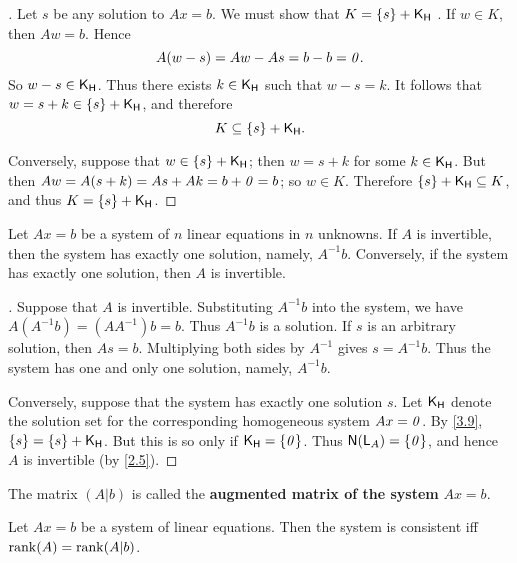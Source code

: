 \begin{proof}[]
	Let \(s\) be any solution to \(Ax = b\).
	We must show that \(K = \left\lbrace s\right\rbrace + \mathsf{K}_{\mathsf{H}}\) .
	If \(w \in K\), then \(Aw = b\).
	Hence
	\[
		A(w - s) = Aw - As = b - b = \mathit{0}.
	\]
	So \(w - s \in \mathsf{K}_{\mathsf{H}}\).
	Thus there exists \(k \in \mathsf{K}_{\mathsf{H}}\) such that \(w - s = k\).
	It follows that \(w = s + k \in \left\lbrace s\right\rbrace + \mathsf{K}_{\mathsf{H}}\), and therefore
	\[
		K \subseteq \left\lbrace s\right\rbrace + \mathsf{K}_{\mathsf{H}}.
	\]

	Conversely, suppose that \(w \in \left\lbrace s\right\rbrace + \mathsf{K}_{\mathsf{H}}\);
	then \(w = s + k\) for some \(k \in \mathsf{K}_{\mathsf{H}}\).
	But then \(Aw = A(s + k) = As + Ak = b + \mathit{0} = b\);
	so \(w \in K\).
	Therefore \(\left\lbrace s\right\rbrace + \mathsf{K}_{\mathsf{H}} \subseteq K\), and thus \(K = \left\lbrace s\right\rbrace + \mathsf{K}_{\mathsf{H}}\).
\end{proof}

\begin{thm}\label{3.10}
	Let \(Ax = b\) be a system of \(n\) linear equations in \(n\) unknowns.
	If \(A\) is invertible, then the system has exactly one solution, namely, \(A^{-1} b\).
	Conversely, if the system has exactly one solution, then \(A\) is invertible.
\end{thm}

\begin{proof}[]
	Suppose that \(A\) is invertible.
	Substituting \(A^{-1} b\) into the system, we have \(A (A^{-1} b) = (A A^{-1}) b = b\).
	Thus \(A^{-1} b\) is a solution.
	If \(s\) is an arbitrary solution, then \(As = b\).
	Multiplying both sides by \(A^{-1}\) gives \(s = A^{-1} b\).
	Thus the system has one and only one solution, namely, \(A^{-1} b\).

	Conversely, suppose that the system has exactly one solution \(s\).
	Let \(\mathsf{K}_{\mathsf{H}}\) denote the solution set for the corresponding homogeneous system \(Ax = \mathit{0}\).
	By \cref{3.9}, \(\left\lbrace s\right\rbrace = \left\lbrace s\right\rbrace + \mathsf{K}_{\mathsf{H}}\).
	But this is so only if \(\mathsf{K}_{\mathsf{H}} = \left\lbrace\mathit{0}\right\rbrace\).
	Thus \(\ns{\L_A} = \set{\zv}\), and hence \(A\) is invertible (by \cref{2.5}).
\end{proof}

\begin{defn}\label{3.3.5}
	The matrix \((A | b)\) is called the \textbf{augmented matrix of the system} \(Ax = b\).
\end{defn}

\begin{thm}\label{3.11}
	Let \(Ax = b\) be a system of linear equations.
	Then the system is consistent iff \(\rk{A} = \rk{A | b}\).
\end{thm}

